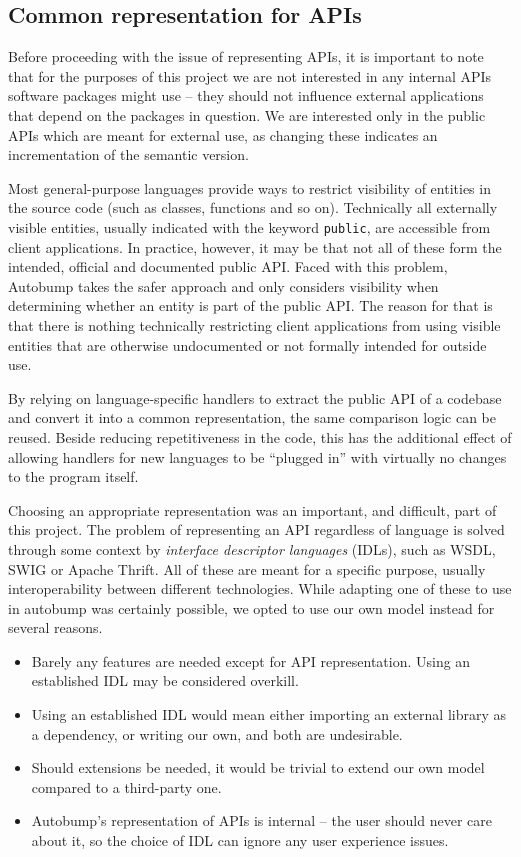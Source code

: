 \documentclass{l4proj}
\begin{document}
\subsection{Common representation for APIs}

Before proceeding with the issue of representing APIs, it is important
to note that for the purposes of this project we are not interested in
any internal APIs software packages might use -- they should not
influence external applications that depend on the packages in question.
We are interested only in the public APIs which are meant for external
use, as changing these indicates an incrementation of the semantic version.

Most general-purpose languages provide ways to restrict visibility of
entities in the source code (such as classes, functions and so on).
Technically all externally visible entities, usually indicated with the keyword
\texttt{public}, are accessible from client applications. In practice,
however, it may be that not all of these form the intended, official
and documented public API. Faced with this problem, Autobump takes the
safer approach and only considers visibility when determining whether
an entity is part of the public API. The reason for that is that there
is nothing technically restricting client applications from using
visible entities that are otherwise undocumented or not formally
intended for outside use.

By relying on language-specific handlers to extract the public API of
a codebase and convert it into a common representation, the same
comparison logic can be reused. Beside reducing repetitiveness in the
code, this has the additional effect of allowing handlers for new
languages to be ``plugged in'' with virtually no changes to the
program itself.

Choosing an appropriate representation was an important, and
difficult, part of this project. The problem of representing an API
regardless of language is solved through some context by
\textit{interface descriptor languages} (IDLs), such as
WSDL\cite{WSDL}, SWIG\cite{SWIG} or Apache Thrift\cite{Thrift}. All of
these are meant for a specific purpose, usually interoperability between
different technologies. While adapting one of these to use in autobump
was certainly possible, we opted to use our own model instead for
several reasons.

\begin{itemize}
\item Barely any features are needed except for API representation.
Using an established IDL may be considered overkill.
\item Using an established IDL would mean either importing an external
library as a dependency, or writing our own, and both are undesirable.
\item Should extensions be needed, it would be trivial to extend our
own model compared to a third-party one.
\item Autobump's representation of APIs is internal -- the user should
never care about it, so the choice of IDL can ignore any user
experience issues.
\end{itemize}
\end{document}
